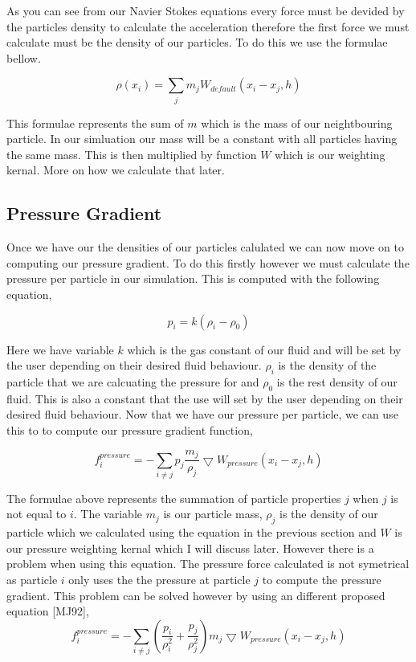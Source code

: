 As you can see from our Navier Stokes equations every force must be devided by the particles density to calculate the acceleration therefore the first force we must calculate must be the density of our particles. To do this we use the formulae bellow.\par
 \[ \rho(x_i)= \sum\limits_{j}m_j W_{default}(x_i-x_j,h) \]\par
 This formulae represents the sum of $m$ which is the mass of our neightbouring particle. In our simluation our mass will be a constant with all particles having the same mass. This is then multiplied by function $W$ which is our weighting kernal. More on how we calculate that later.

\subsection*{Pressure Gradient }

Once we have our the densities of our particles calulated we can now move on to computing our pressure gradient. To do this firstly however we must calculate the pressure per particle in our simulation. This is computed with the following equation,\par
 \[ p_i = k(\rho_i - \rho_0) \]\par
 Here we have variable $k$ which is the gas constant of our fluid and will be set by the user depending on their desired fluid behaviour. $\rho_i$ is the density of the particle that we are calcuating the pressure for and $\rho_0$ is the rest density of our fluid. This is also a constant that the use will set by the user depending on their desired fluid behaviour. Now that we have our pressure per particle, we can use this to to compute our pressure gradient function,\par
 \[ f_i^{pressure} = -\sum\limits_{i\neq j}p_j\frac{m_j}{\rho_j}\bigtriangledown W_{pressure}(x_i-x_j,h) \]\par
The formulae above represents the summation of particle properties $j$ when $j$ is not equal to $i$. The variable $m_j$ is our particle mass, $\rho_j$ is the density of our particle which we calculated using the equation in the previous section and $W$ is our pressure weighting kernal which I will discuss later. However there is a problem when using this equation. The pressure force calculated is not symetrical as particle $i$ only uses the the pressure at particle $j$ to compute the pressure gradient. This problem can be solved however by using an different proposed equation \mbox{[}M\-J92\mbox{]}, \[ f_i^{pressure} = -\sum\limits_{i\neq j}(\frac{p_i}{\rho_i^2} + \frac{p_j}{\rho_j^2})m_j\bigtriangledown W_{pressure}(x_i-x_j,h) \]

